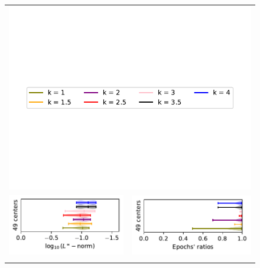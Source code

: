 \documentclass[12pt]{report} %
\begin{document}
\begin{figure}[h]
  \begin{tabular}{rl}
    \multicolumn{2}{c}{{\includegraphics[width=.7\textwidth, trim={0.5cm 4cm .5cm 3.8cm},clip=true]
          {imagenes/experiments/1d/statistical_1d_full/runge_function/runge_function_legend.pdf}}} \\ 
    {\includegraphics[width=.5\textwidth, trim={0 1.25cm 0 0},clip=true]
    {imagenes/experiments/2d/pde_fornberg_wright/linf_pde_C7_gaussian_kernel.pdf}}  & 
    {\includegraphics[width=.44\textwidth, trim={.7cm 1.15cm 0 0},clip=true]
    {imagenes/experiments/2d/pde_fornberg_wright/epochs_pde_C7_gaussian_kernel.pdf}}                                                                                      \\
    {\includegraphics[width=.5\textwidth, trim={0 1.25cm 0 0},clip=true]
}
\end{tabular}
\end{figure}
\end{document}
